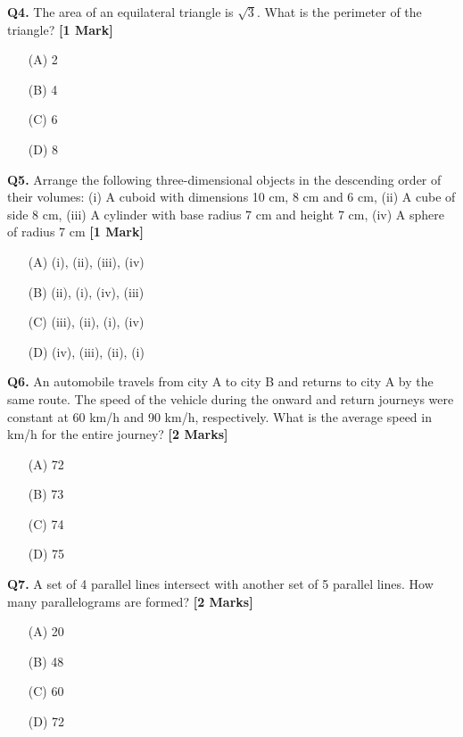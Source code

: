 \documentclass[11pt]{article}
\newcommand{\questiona}[2]{
    \noindent\textbf{Q#2.} #1 \hfill \textbf{[1 Mark]}
}
\newcommand{\questionb}[2]{
    \noindent\textbf{Q#2.} #1 \hfill \textbf{[2 Marks]}
}
\begin{document}
\questiona{The area of an equilateral triangle is \(\sqrt{3}\). What is the perimeter of the triangle?}{4}
\begin{enumerate}
    \item[(A)] 2  
    \item[(B)] 4  
    \item[(C)] 6  
    \item[(D)] 8  
\end{enumerate}
\vspace{0.5cm}

\questiona{Arrange the following three-dimensional objects in the descending order of their volumes: (i) A cuboid with dimensions 10 cm, 8 cm and 6 cm, (ii) A cube of side 8 cm, (iii) A cylinder with base radius 7 cm and height 7 cm, (iv) A sphere of radius 7 cm}{5}
\begin{enumerate}
    \item[(A)] (i), (ii), (iii), (iv)  
    \item[(B)] (ii), (i), (iv), (iii)  
    \item[(C)] (iii), (ii), (i), (iv)  
    \item[(D)] (iv), (iii), (ii), (i)  
\end{enumerate}
\vspace{0.5cm}

\questionb{An automobile travels from city A to city B and returns to city A by the same route. The speed of the vehicle during the onward and return journeys were constant at 60 km/h and 90 km/h, respectively. What is the average speed in km/h for the entire journey?}{6}
\begin{enumerate}
    \item[(A)] 72  
    \item[(B)] 73  
    \item[(C)] 74  
    \item[(D)] 75  
\end{enumerate}
\vspace{0.5cm}

\questionb{A set of 4 parallel lines intersect with another set of 5 parallel lines. How many parallelograms are formed?}{7}
\begin{enumerate}
    \item[(A)] 20  
    \item[(B)] 48  
    \item[(C)] 60  
    \item[(D)] 72  
\end{enumerate}
\vspace{0.5cm}
\end{document}
